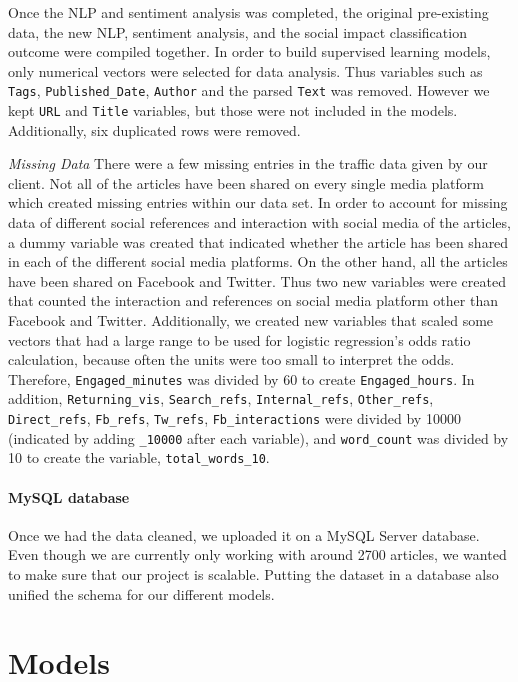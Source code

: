 \documentclass[10pt,letterpaper]{article}
\begin{document}
Once the NLP and sentiment analysis was completed, the original
pre-existing data, the new NLP, sentiment analysis, and the social
impact classification outcome were compiled together. In order to build
supervised learning models, only numerical vectors were selected for
data analysis. Thus variables such as \texttt{Tags},
\texttt{Published\_Date}, \texttt{Author} and the parsed \texttt{Text}
was removed. However we kept \texttt{URL} and \texttt{Title} variables,
but those were not included in the models. Additionally, six duplicated
rows were removed.

\emph{Missing Data} There were a few missing entries in the traffic data
given by our client. Not all of the articles have been shared on every
single media platform which created missing entries within our data set.
In order to account for missing data of different social references and
interaction with social media of the articles, a dummy variable was
created that indicated whether the article has been shared in each of
the different social media platforms. On the other hand, all the
articles have been shared on Facebook and Twitter. Thus two new
variables were created that counted the interaction and references on
social media platform other than Facebook and Twitter. Additionally, we
created new variables that scaled some vectors that had a large range to
be used for logistic regression's odds ratio calculation, because often
the units were too small to interpret the odds. Therefore,
\texttt{Engaged\_minutes} was divided by 60 to create
\texttt{Engaged\_hours}. In addition, \texttt{Returning\_vis},
\texttt{Search\_refs}, \texttt{Internal\_refs}, \texttt{Other\_refs},
\texttt{Direct\_refs}, \texttt{Fb\_refs}, \texttt{Tw\_refs},
\texttt{Fb\_interactions} were divided by 10000 (indicated by adding
\texttt{\_10000} after each variable), and \texttt{word\_count} was
divided by 10 to create the variable, \texttt{total\_words\_10}.

\paragraph{MySQL database}\label{mysql-database}

Once we had the data cleaned, we uploaded it on a MySQL Server database.
Even though we are currently only working with around 2700 articles, we
wanted to make sure that our project is scalable. Putting the dataset in
a database also unified the schema for our different models.

\section{Models}\label{models}
\end{document}
